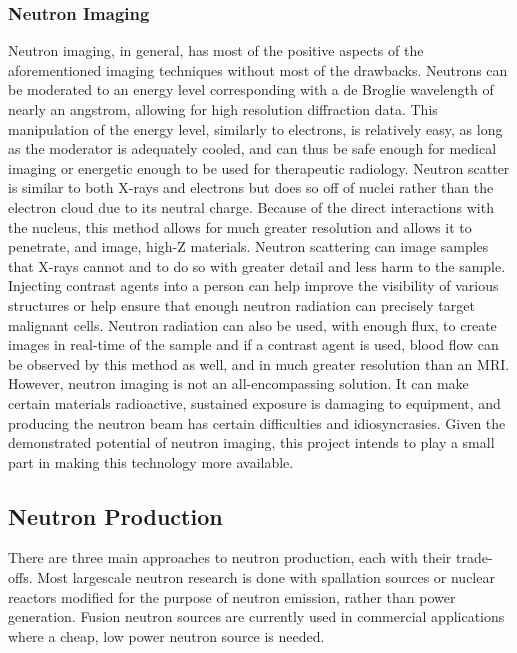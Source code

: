 \subsubsection{Neutron Imaging}

Neutron imaging, in general, has most of the positive aspects of the aforementioned imaging techniques without most of the drawbacks. Neutrons can be moderated to an energy level corresponding with a de Broglie wavelength of nearly an angstrom, allowing for high resolution diffraction data. This manipulation of the energy level, similarly to electrons, is relatively easy, as long as the moderator is adequately cooled, and can thus be safe enough for medical imaging or energetic enough to be used for therapeutic radiology. Neutron scatter is similar to both X-rays and electrons but does so off of nuclei rather than the electron cloud due to its neutral charge. Because of the direct interactions with the nucleus, this method allows for much greater resolution and allows it to penetrate, and image, high-Z materials. Neutron scattering can image samples that X-rays cannot and to do so with greater detail and less harm to the sample. Injecting contrast agents into a person can help improve the visibility of various structures or help ensure that enough neutron radiation can precisely target malignant cells. Neutron radiation can also be used, with enough flux, to create images in real-time of the sample and if a contrast agent is used, blood flow can be observed by this method as well, and in much greater resolution than an MRI. However, neutron imaging is not an all-encompassing solution. It can make certain materials radioactive, sustained exposure is damaging to equipment, and producing the neutron beam has certain difficulties and idiosyncrasies. Given the demonstrated potential of neutron imaging, this project intends to play a small part in making this technology more available.

\subsection{Neutron Production}

There are three main approaches to neutron production, each with their trade-offs. Most largescale neutron research is done with spallation sources or nuclear reactors modified for the purpose of neutron emission, rather than power generation. Fusion neutron sources are currently used in commercial applications where a cheap, low power neutron source is needed.

